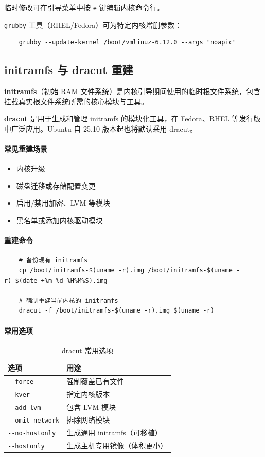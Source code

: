 \documentclass[12pt,UTF8]{ctexbook}
\begin{document}
临时修改可在引导菜单中按 \texttt{e} 键编辑内核命令行。
	
\texttt{grubby} 工具（RHEL/Fedora）可为特定内核增删参数：
\begin{verbatim}
	grubby --update-kernel /boot/vmlinuz-6.12.0 --args "noapic"
\end{verbatim}
	
\subsection{initramfs 与 dracut 重建}

\textbf{initramfs}（初始 RAM 文件系统）是内核引导期间使用的临时根文件系统，包含挂载真实根文件系统所需的核心模块与工具。
	
\textbf{dracut} 是用于生成和管理 initramfs 的模块化工具，在 Fedora、RHEL 等发行版中广泛应用。Ubuntu 自 25.10 版本起也将默认采用 dracut。
	
\paragraph{常见重建场景}
\begin{itemize}
	\item 内核升级
	\item 磁盘迁移或存储配置变更
	\item 启用/禁用加密、LVM 等模块
	\item 黑名单或添加内核驱动模块
\end{itemize}
	
\paragraph{重建命令}

\begin{verbatim}
	# 备份现有 initramfs
	cp /boot/initramfs-$(uname -r).img /boot/initramfs-$(uname -r)-$(date +%m-%d-%H%M%S).img
	
	# 强制重建当前内核的 initramfs
	dracut -f /boot/initramfs-$(uname -r).img $(uname -r)
\end{verbatim}
	
\paragraph{常用选项}

\begin{table}[htbp]
	\centering
	\caption{dracut 常用选项}
	\begin{tabular}{@{}ll@{}}
		\toprule
		\textbf{选项} & \textbf{用途} \\
		\midrule
		\verb|--force| & 强制覆盖已有文件 \\
		\verb|--kver| & 指定内核版本 \\
		\verb|--add lvm| & 包含 LVM 模块 \\
		\verb|--omit network| & 排除网络模块 \\
		\verb|--no-hostonly| & 生成通用 initramfs（可移植） \\
		\verb|--hostonly| & 生成主机专用镜像（体积更小） \\
		\bottomrule
	\end{tabular}
\end{table}
	
\end{document}
